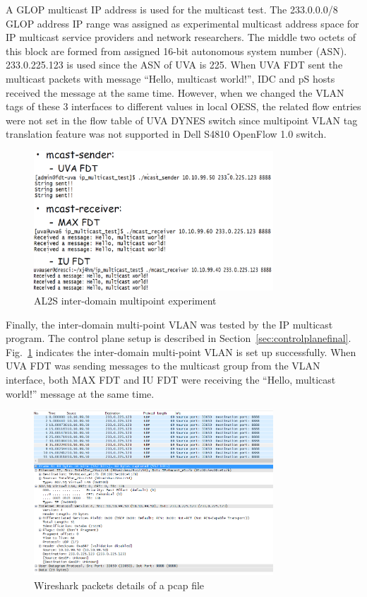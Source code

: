 A GLOP multicast IP address is used for the multicast test. The 233.0.0.0/8 GLOP address IP range was assigned as experimental multicast address space for IP multicast service providers and network researchers. The middle two octets of this block are formed from assigned 16-bit autonomous system number (ASN). 233.0.225.123 is used since the ASN of UVA is 225.  When UVA FDT sent the multicast packets with message ``Hello, multicast world!'', IDC and pS hosts received the message at the same time. However, when we changed the VLAN tags of these 3 interfaces to different values in local OESS, the related flow entries were not set in the flow table of UVA DYNES switch since multipoint VLAN tag translation feature was not supported in Dell S4810 OpenFlow 1.0 switch.
\begin{figure}[htb!]
\centering
\includegraphics[width=0.8\textwidth]{figures/AL2Smulticast.png}
\caption{AL2S inter-domain multipoint experiment}
\label{fig:widemulticast}
\end{figure}


Finally, the inter-domain multi-point VLAN was tested by the IP multicast program. The control plane setup is described in Section~\ref{sec:controlplanefinal}. Fig.~\ref{fig:widemulticast} indicates the inter-domain multi-point VLAN is set up successfully. When UVA FDT was sending messages to the multicast group from the VLAN interface, both MAX FDT and IU FDT were receiving the ``Hello, multicast world!'' message at the same time.


\begin{figure}[htb!]
\centering
\includegraphics[width=0.8\textwidth]{figures/pcap.png}
\caption{Wireshark packets details of a pcap file}
\label{fig:pcap}
\end{figure}

